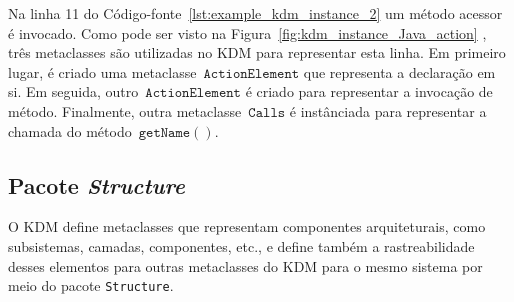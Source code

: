 
Na linha 11 do Código-fonte~\ref{lst:example_kdm_instance_2}  um método acessor é invocado. Como pode ser visto na Figura~\ref{fig:kdm_instance_Java_action} , três metaclasses são utilizadas no KDM para representar esta linha. Em primeiro lugar, é criado uma metaclasse~$\mathtt{ActionElement}$ que representa a declaração em si. Em seguida, outro~$\mathtt{ActionElement}$ é criado para representar a invocação de método. Finalmente, outra metaclasse~$\mathtt{Calls}$ é instânciada para representar a chamada do método~$\mathtt{getName()}$.


\subsection{Pacote \textit{Structure}}\label{sec:structurePackage}

O KDM define metaclasses que representam componentes arquiteturais, como subsistemas, camadas, componentes, etc., e define também a rastreabilidade desses elementos para outras metaclasses do KDM para o mesmo sistema por meio do pacote \texttt{Structure}.

